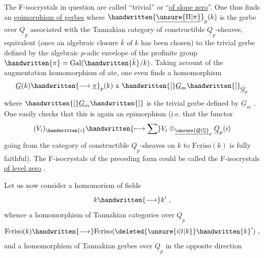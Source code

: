 The F-isocrystals in question are called ``trivial'' or ``\uline{of slope zero}''. One thus finds an \uline{epimorphism of gerbes}
where $\handwritten{\underline{\unsure{\Pi|\pi}}}_p(k)$ is the gerbe over $\underline{Q}_p$  associated with the Tannakian category of constructible $\underline{Q}_p$-sheaves, equivalent  (once an algebraic closure $\bar{k}$ of $k$ has been chosen) to the trivial gerbe defined by the algebraic  $p$-adic envelope of the profinite group $\handwritten{\pi}=\operatorname{Gal}(\handwritten{\bar{k}}/k)$. Taking account of the augmentation homomorphism of ate, one even finds a homomorphism
\[
\underline{G}(k)\handwritten{\longrightarrow\underline{\pi}}_p(k)\ \mathrm{x}\ \handwritten{[}\underline{G}_m\handwritten{]}_{\underline{Q}_p}
\]
where $\handwritten{[}\underline{G}_m\handwritten{]}$ is the trivial gerbe defined by $\underline{G}_m$ . One easily checks that this is again an epimorphism (i.e. that the functor
\[
(V_i)_{\handwritten{i}}\handwritten{\longmapsto\sum}V_i\otimes_{\underline{\unsure{\not Q|\mathbb{Q}}}_p}\underline{Q}_p(i)
\]
going from the category of   constructible $\underline{Q}_p$-sheaves  on $k$ to $\mathrm{Fcriso}(k)$ is fully faithful). The F-isocrystals of the preceding form could be called the F-isocrystals \uline{of level zero} .

 Let us now consider a homomorism of fields\textsubscript{}
\[
k\handwritten{\longrightarrow}k'\ ,
\]
whence a homomorphism of Tannakian categories over $\underline{Q}_p$
\[
\mathrm{Fcriso}(k)\handwritten{\longrightarrow}\mathrm{Fcriso}(\deleted{\unsure{i|t|k}}\handwritten{k}')\ ,
\]
and a homomorphism of Tannakian gerbes over $\underline{Q}_p$ in the opposite direction

